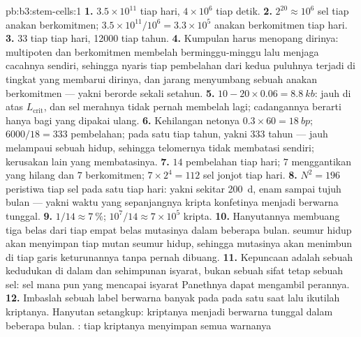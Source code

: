 \begin{solution}{pb:b3:stem-cells:1}
\textbf{1.} $3.5\times 10^{11}$ tiap hari, $4\times 10^{6}$ tiap detik.
\textbf{2.} $2^{20} \approx 10^{6}$ sel tiap anakan berkomitmen;
$3.5\times 10^{11}/10^{6} = 3.3\times 10^{5}$ anakan berkomitmen tiap hari.
\textbf{3.} $33$ tiap  tiap hari, \num{12000} tiap tahun.
\textbf{4.} Kumpulan  harus menopang dirinya:  multipoten
dan berkomitmen membelah berminggu-minggu lalu menjaga cacahnya sendiri,
sehingga nyaris tiap pembelahan dari kedua puluhnya terjadi di tingkat yang membarui
dirinya, dan  jarang menyumbang sebuah anakan berkomitmen
--- yakni berorde sekali setahun.
\textbf{5.} $10 - 20\times 0.06 = \qty{8.8}{kb}$: jauh di atas
$L_{\text{crit}}$, dan sel merahnya tidak pernah membelah lagi; cadangannya
berarti hanya bagi  yang dipakai ulang.
\textbf{6.} Kehilangan netonya $0.3\times 60 = \qty{18}{bp}$; $6000/18 = 333$
pembelahan; pada satu tiap tahun, yakni $333$ tahun --- jauh melampaui sebuah hidup, sehingga
telomernya tidak membatasi  sendiri; kerusakan lain yang membatasinya.
\textbf{7.} $14$ pembelahan tiap hari; $7$ menggantikan  yang hilang dan $7$
berkomitmen; $7\times 2^{4} = 112$ sel jonjot tiap hari.
\textbf{8.} $N^{2} = 196$ peristiwa tiap sel pada satu tiap hari: yakni sekitar
\qty{200}{d}, enam sampai tujuh bulan --- yakni waktu yang sepanjangnya kripta
konfetinya menjadi berwarna tunggal.
\textbf{9.} $1/14 \approx \qty{7}{\%}$; $10^{7}/14 \approx 7\times 10^{5}$
kripta.
\textbf{10.} Hanyutannya membuang tiga belas dari tiap empat belas mutasinya
dalam beberapa bulan.  seumur hidup akan menyimpan tiap  mutan seumur hidup, sehingga mutasinya akan menimbun di tiap garis keturunannya
tanpa pernah dibuang.
\textbf{11.} Kepuncaan adalah sebuah kedudukan di dalam  dan sehimpunan isyarat,
bukan sebuah sifat tetap sebuah sel: sel mana pun yang mencapai isyarat
Panethnya dapat mengambil perannya.
\textbf{12.} Imbaslah sebuah label berwarna banyak pada  pada satu saat
lalu ikutilah kriptanya. Hanyutan setangkup: kriptanya menjadi berwarna tunggal
dalam beberapa bulan. : tiap kriptanya menyimpan semua warnanya

\end{solution}
